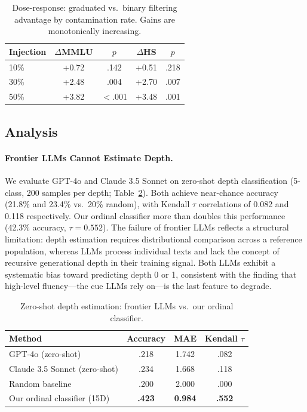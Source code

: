 \documentclass[11pt,a4paper]{article}
\begin{document}
\begin{table}[t]
\centering
\small
\caption{Dose-response: graduated vs.\ binary filtering advantage by contamination rate. Gains are monotonically increasing.}
\label{tab:dose}
\begin{tabular}{lcccc}
\toprule
\textbf{Injection} & \textbf{$\Delta$MMLU} & \textbf{$p$} & \textbf{$\Delta$HS} & \textbf{$p$} \\
\midrule
10\% & +0.72 & .142 & +0.51 & .218 \\
30\% & +2.48 & .004 & +2.70 & .007 \\
50\% & +3.82 & $<$.001 & +3.48 & .001 \\
\bottomrule
\end{tabular}
\end{table}

\subsection{Analysis}

\paragraph{Frontier LLMs Cannot Estimate Depth.}
We evaluate GPT-4o and Claude 3.5 Sonnet on zero-shot depth classification (5-class, 200 samples per depth; Table~\ref{tab:llm_baseline}).
Both achieve near-chance accuracy (21.8\% and 23.4\% vs.\ 20\% random), with Kendall $\tau$ correlations of 0.082 and 0.118 respectively.
Our ordinal classifier more than doubles this performance (42.3\% accuracy, $\tau=0.552$).
The failure of frontier LLMs reflects a structural limitation: depth estimation requires distributional comparison across a reference population, whereas LLMs process individual texts and lack the concept of recursive generational depth in their training signal.
Both LLMs exhibit a systematic bias toward predicting depth 0 or 1, consistent with the finding that high-level fluency---the cue LLMs rely on---is the last feature to degrade.

\begin{table}[t]
\centering
\small
\caption{Zero-shot depth estimation: frontier LLMs vs.\ our ordinal classifier.}
\label{tab:llm_baseline}
\begin{tabular}{lccc}
\toprule
\textbf{Method} & \textbf{Accuracy} & \textbf{MAE} & \textbf{Kendall $\tau$} \\
\midrule
GPT-4o (zero-shot) & .218 & 1.742 & .082 \\
Claude 3.5 Sonnet (zero-shot) & .234 & 1.668 & .118 \\
Random baseline & .200 & 2.000 & .000 \\
Our ordinal classifier (15D) & \textbf{.423} & \textbf{0.984} & \textbf{.552} \\
\bottomrule
\end{tabular}
\end{table}
\end{document}
